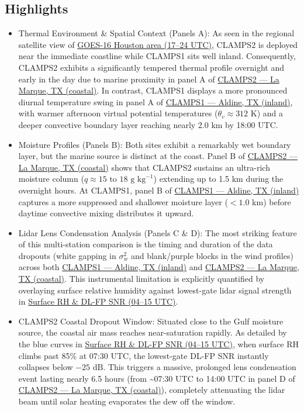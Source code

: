 \documentclass[11pt]{article}
\begin{document}
\subsection*{Highlights}
\begin{itemize}
  \item Thermal Environment \& Spatial Context (Panels A): As seen in the regional satellite view of \hyperref[fig:sea_breeze:sea_breeze_goes16_houston_seabreeze]{GOES-16 Houston area (17–24 UTC)}, CLAMPS2 is deployed near the immediate coastline while CLAMPS1 sits well inland. Consequently, CLAMPS2 exhibits a significantly tempered thermal profile overnight and early in the day due to marine proximity in panel A of \hyperref[fig:sea_breeze:sea_breeze_c2_instrument_template_4panel]{CLAMPS2 — La Marque, TX (coastal)}. In contrast, CLAMPS1 displays a more pronounced diurnal temperature swing in panel A of \hyperref[fig:sea_breeze:sea_breeze_c1_instrument_template_4panel]{CLAMPS1 — Aldine, TX (inland)}, with warmer afternoon virtual potential temperatures ($\theta_v \approx 312\text{ K}$) and a deeper convective boundary layer reaching nearly 2.0 km by 18:00 UTC.
  \item Moisture Profiles (Panels B): Both sites exhibit a remarkably wet boundary layer, but the marine source is distinct at the coast. Panel B of \hyperref[fig:sea_breeze:sea_breeze_c2_instrument_template_4panel]{CLAMPS2 — La Marque, TX (coastal)} shows that CLAMPS2 sustains an ultra-rich moisture column ($q \approx 15\text{ to }18\text{ g kg}^{-1}$) extending up to 1.5 km during the overnight hours. At CLAMPS1, panel B of \hyperref[fig:sea_breeze:sea_breeze_c1_instrument_template_4panel]{CLAMPS1 — Aldine, TX (inland)} captures a more suppressed and shallower moisture layer ($<1.0\text{ km}$) before daytime convective mixing distributes it upward.
  \item Lidar Lens Condensation Analysis (Panels C \& D): The most striking feature of this multi-station comparison is the timing and duration of the data dropouts (white gapping in $\sigma_w^2$ and blank/purple blocks in the wind profiles) across both \hyperref[fig:sea_breeze:sea_breeze_c1_instrument_template_4panel]{CLAMPS1 — Aldine, TX (inland)} and \hyperref[fig:sea_breeze:sea_breeze_c2_instrument_template_4panel]{CLAMPS2 — La Marque, TX (coastal)}. This instrumental limitation is explicitly quantified by overlaying surface relative humidity against lowest-gate lidar signal strength in \hyperref[fig:sea_breeze:sea_breeze_aux_seabreeze_rh_snr]{Surface RH \& DL-FP SNR (04–15 UTC)}.
  \item CLAMPS2 Coastal Dropout Window: Situated close to the Gulf moisture source, the coastal air mass reaches near-saturation rapidly. As detailed by the blue curves in \hyperref[fig:sea_breeze:sea_breeze_aux_seabreeze_rh_snr]{Surface RH \& DL-FP SNR (04–15 UTC)}, when surface RH climbs past 85\% at 07:30 UTC, the lowest-gate DL-FP SNR instantly collapses below $-25\text{ dB}$. This triggers a massive, prolonged lens condensation event lasting nearly 6.5 hours (from \textasciitilde{}07:30 UTC to 14:00 UTC in panel D of \hyperref[fig:sea_breeze:sea_breeze_c2_instrument_template_4panel]{CLAMPS2 — La Marque, TX (coastal)}), completely attenuating the lidar beam until solar heating evaporates the dew off the window.

\end{itemize}
\end{document}
